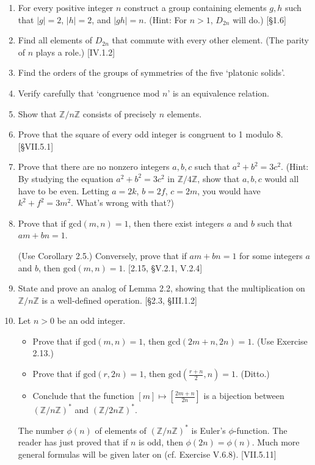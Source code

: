 \begin{enumerate}
    \item For every positive integer $n$ construct a group containing elements $g, h$ such that $|g|=2$, $|h|=2$, and $|gh|=n$. (Hint: For $n > 1$, $D_{2n}$ will do.) [\S1.6]

    \item Find all elements of $D_{2n}$ that commute with every other element. (The parity of $n$ plays a role.) [IV.1.2]

    \item Find the orders of the groups of symmetries of the five `platonic solids'.

    \item Verify carefully that `congruence mod $n$' is an equivalence relation.

    \item Show that $\mathbb{Z}/n\mathbb{Z}$ consists of precisely $n$ elements.

    \item Prove that the square of every odd integer is congruent to 1 modulo 8. [\S VII.5.1]

    \item Prove that there are no nonzero integers $a, b, c$ such that $a^2+b^2=3c^2$. (Hint: By studying the equation $a^2+b^2=3c^2$ in $\mathbb{Z}/4\mathbb{Z}$, show that $a, b, c$ would all have to be even. Letting $a=2k$, $b=2f$, $c=2m$, you would have $k^2+f^2=3m^2$. What's wrong with that?)

    \item Prove that if $\text{gcd}(m, n)=1$, then there exist integers $a$ and $b$ such that $am+bn=1$.

          (Use Corollary 2.5.) Conversely, prove that if $am+bn=1$ for some integers $a$ and $b$, then $\text{gcd}(m, n)=1$. [2.15, \S V.2.1, V.2.4]

    \item State and prove an analog of Lemma 2.2, showing that the multiplication on $\mathbb{Z}/n\mathbb{Z}$ is a well-defined operation. [\S2.3, \S III.1.2]

    \item Let $n > 0$ be an odd integer.
          \begin{itemize}
              \item Prove that if $\text{gcd}(m, n)=1$, then $\text{gcd}(2m+n, 2n)=1$. (Use Exercise 2.13.)
              \item Prove that if $\text{gcd}(r, 2n)=1$, then $\text{gcd}(\frac{r+n}{2}, n)=1$. (Ditto.)
              \item Conclude that the function $[m] \mapsto [\frac{2m+n}{2n}]$ is a bijection between $(\mathbb{Z}/n\mathbb{Z})^*$ and $(\mathbb{Z}/2n\mathbb{Z})^*$.
          \end{itemize}
          The number $\phi(n)$ of elements of $(\mathbb{Z}/n\mathbb{Z})^*$ is Euler's $\phi$-function. The reader has just proved that if $n$ is odd, then $\phi(2n) = \phi(n)$. Much more general formulas will be given later on (cf. Exercise V.6.8). [VII.5.11]


\end{enumerate}
